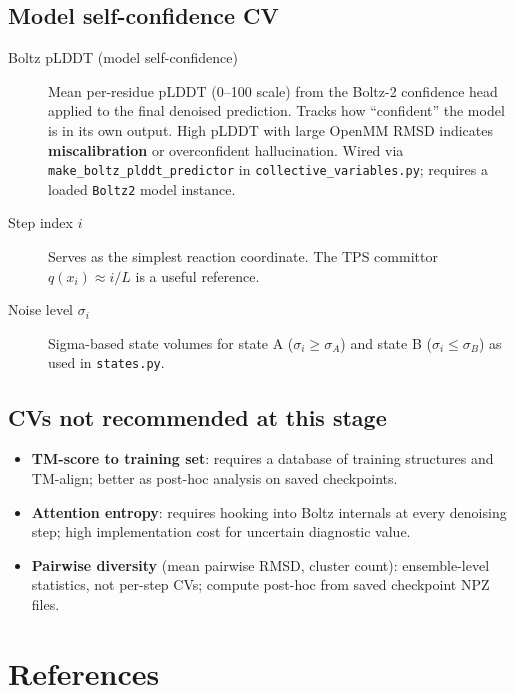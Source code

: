 \documentclass[11pt,a4paper]{article}
\begin{document}
\subsection*{Model self-confidence CV}
\begin{description}
  \item[Boltz pLDDT (model self-confidence)]
    Mean per-residue pLDDT (0--100 scale) from the Boltz-2 confidence head
    applied to the final denoised prediction.  Tracks how ``confident'' the
    model is in its own output.  High pLDDT with large OpenMM RMSD indicates
    \textbf{miscalibration} or overconfident hallucination.  Wired via
    \texttt{make\_boltz\_plddt\_predictor} in \texttt{collective\_variables.py};
    requires a loaded \texttt{Boltz2} model instance.

  \item[Step index $i$] Serves as the simplest reaction coordinate.
    The TPS committor $q(x_i) \approx i/L$ is a useful reference.

  \item[Noise level $\sigma_i$] Sigma-based state volumes for state A
    ($\sigma_i \geq \sigma_A$) and state B ($\sigma_i \leq \sigma_B$)
    as used in \texttt{states.py}.
\end{description}

\subsection*{CVs not recommended at this stage}
\begin{itemize}
  \item \textbf{TM-score to training set}: requires a database of training
    structures and TM-align; better as post-hoc analysis on saved checkpoints.
  \item \textbf{Attention entropy}: requires hooking into Boltz internals at
    every denoising step; high implementation cost for uncertain diagnostic value.
  \item \textbf{Pairwise diversity} (mean pairwise RMSD, cluster count):
    ensemble-level statistics, not per-step CVs; compute post-hoc from
    saved checkpoint NPZ files.
\end{itemize}

\section*{References}
\end{document}
